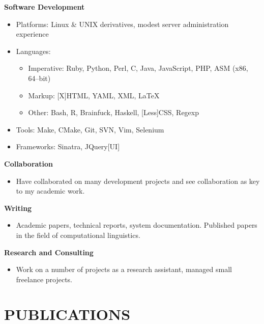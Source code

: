 \documentclass{res}
\begin{document}
\begin{resume}
   {\bf Software Development}
        \begin{itemize}
            \item[] Platforms: Linux \& UNIX derivatives, modest server administration experience
            \item[] Languages:
                \begin{itemize}
                    \item Imperative: Ruby, Python, Perl, C, Java, JavaScript, PHP, ASM (x86, 64--bit)
                    \item Markup: [X]HTML, YAML, XML, \LaTeX
                    \item Other: Bash, R, Brainfuck, Haskell, [Less]CSS, Regexp
                \end{itemize}
            \item[] Tools: Make, CMake, Git, SVN, Vim, Selenium
            \item[] Frameworks: Sinatra, JQuery[UI]
        \end{itemize}

  {\bf Collaboration}
    \begin{itemize}
      \item[] Have collaborated on many development projects and see collaboration as key to my academic work.
      \end{itemize}

  {\bf Writing}
    \begin{itemize} %
      \item[] Academic papers, technical reports, system documentation.
        Published papers in the field of computational linguistics.
      \end{itemize}


   {\bf  Research and Consulting}
    \begin{itemize}
        \item[] Work on a number of projects as a research assistant, managed small freelance projects.
    \end{itemize}


\section{PUBLICATIONS}
\vspace{0.1in}




\end{resume}
\end{document}
